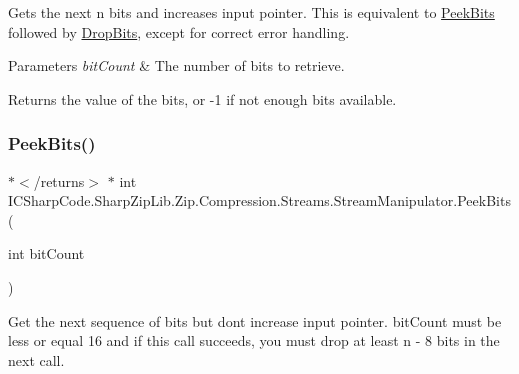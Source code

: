 Gets the next n bits and increases input pointer. This is equivalent to \hyperlink{class_i_c_sharp_code_1_1_sharp_zip_lib_1_1_zip_1_1_compression_1_1_streams_1_1_stream_manipulator_acffdc659e2508d7642be37f3c0fa1ec0}{Peek\+Bits} followed by \hyperlink{class_i_c_sharp_code_1_1_sharp_zip_lib_1_1_zip_1_1_compression_1_1_streams_1_1_stream_manipulator_a133a3593f65193421981087e5f32b6a3}{Drop\+Bits}, except for correct error handling. 


\begin{DoxyParams}{Parameters}
{\em bit\+Count} & The number of bits to retrieve.\\
\hline
\end{DoxyParams}
\begin{DoxyReturn}{Returns}
the value of the bits, or -\/1 if not enough bits available. 
\end{DoxyReturn}
\mbox{\label{class_i_c_sharp_code_1_1_sharp_zip_lib_1_1_zip_1_1_compression_1_1_streams_1_1_stream_manipulator_acffdc659e2508d7642be37f3c0fa1ec0}} 
\subsubsection{\texorpdfstring{Peek\+Bits()}{PeekBits()}\hspace{0.1cm}{\footnotesize\ttfamily [1/2]}}
{\footnotesize\ttfamily $\ast$$<$/returns$>$ $\ast$ int I\+C\+Sharp\+Code.\+Sharp\+Zip\+Lib.\+Zip.\+Compression.\+Streams.\+Stream\+Manipulator.\+Peek\+Bits (\begin{DoxyParamCaption}\item[{int}]{bit\+Count }\end{DoxyParamCaption})\hspace{0.3cm}{\ttfamily [inline]}}



Get the next sequence of bits but don\textquotesingle{}t increase input pointer. bit\+Count must be less or equal 16 and if this call succeeds, you must drop at least n -\/ 8 bits in the next call. 


